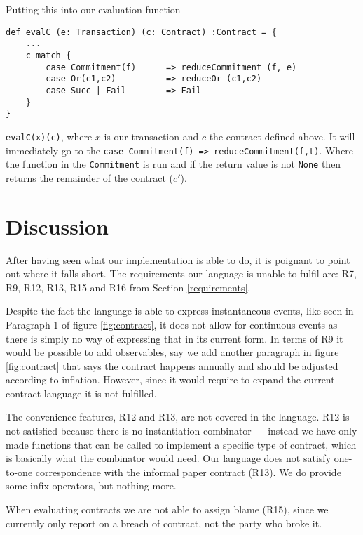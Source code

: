 \documentclass{ituthesis}
\begin{document}
Putting this into our evaluation function 
\begin{lstlisting}
def evalC (e: Transaction) (c: Contract) :Contract = { 
    ...
    c match {
        case Commitment(f)      => reduceCommitment (f, e)
        case Or(c1,c2)          => reduceOr (c1,c2)
        case Succ | Fail        => Fail
    }
}
\end{lstlisting}
\texttt{evalC(x)(c)}, where $x$ is our transaction and $c$ the contract defined above. It will immediately go to the \texttt{case Commitment(f) => reduceCommitment(f,t)}. Where the function in the \texttt{Commitment} is run and if the return value is not \texttt{None} then returns the remainder of the contract ($c'$).


\chapter{Discussion}
After having seen what our implementation is able to do, it is poignant to point out where it falls short. The requirements our language is unable to fulfil are: R7, R9, R12, R13, R15 and R16 from Section \ref{requirements}.

Despite the fact the language is able to express instantaneous events, like seen in Paragraph 1 of figure \ref{fig:contract}, it does not allow for continuous events as there is simply no way of expressing that in its current form. In terms of R9 it would be possible to add observables, say we add another paragraph in figure \ref{fig:contract} that says the contract happens annually and should be adjusted according to inflation. However, since it would require to expand the current contract language it is not fulfilled.

The convenience features, R12 and R13, are not covered in the language. R12 is not satisfied because there is no instantiation combinator --- instead we have only made functions that can be called to implement a specific type of contract, which is basically what the combinator would need. Our language does not satisfy one-to-one correspondence with the informal paper contract (R13). We do provide some infix operators, but nothing more.

When evaluating contracts we are not able to assign blame (R15), since we currently only report on a breach of contract, not the party who broke it.
\end{document}
